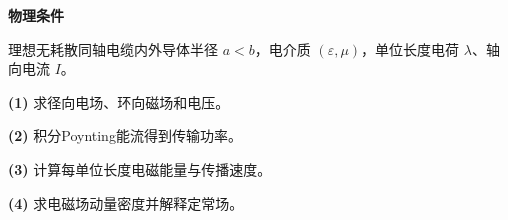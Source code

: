 \textbf{物理条件}\par 理想无耗散同轴电缆内外导体半径 \(a<b\)，电介质 \((\varepsilon,\mu)\)，单位长度电荷 \(\lambda\)、轴向电流 \(I\)。
\par\noindent\textbf{(1)} 求径向电场、环向磁场和电压。
\par\noindent\textbf{(2)} 积分Poynting能流得到传输功率。
\par\noindent\textbf{(3)} 计算每单位长度电磁能量与传播速度。
\par\noindent\textbf{(4)} 求电磁场动量密度并解释定常场。
